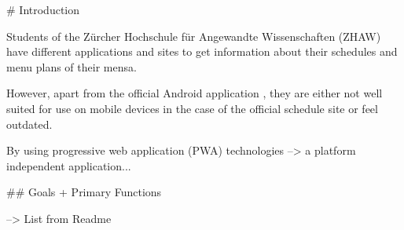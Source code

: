 \begin{markdown}

# Introduction

Students of the Zürcher Hochschule für Angewandte Wissenschaften (ZHAW) have different applications and sites to get
information about their schedules and menu plans of their mensa. 

However, apart from the official Android application \cite{DUMMY},
they are either not well suited for use on mobile devices in the case of the official schedule site \cite{DUMMY} or feel
outdated.

By using progressive web application (PWA) technologies \cite{DUMMY} --> a platform independent application...

## Goals + Primary Functions

--> List from Readme

\end{markdown}
